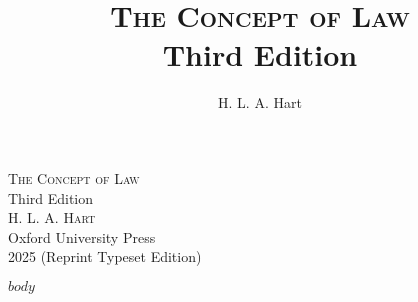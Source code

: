 \documentclass[12pt, oneside]{book}  %
\title{\Huge\textsc{The Concept of Law} \\[2ex] \Large Third Edition}
\author{\Large H. L. A. Hart}
\date{}
\begin{document}
\begin{titlepage}
  \centering
  \vspace*{3cm}
  {\Huge\textsc{The Concept of Law}}\\[1.5ex]
  {\Large Third Edition}\\[4ex]
  \textsc{H. L. A. Hart}\\[6ex]
  {\small Oxford University Press\\
  2025 (Reprint Typeset Edition)}
  \vfill
\end{titlepage}

$body$  %
\end{document}
